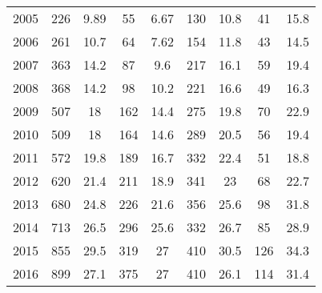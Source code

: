 \begin{table}[htbp]
\begin{tabular}{l*{8}{c}}
2005      &      226&     9.89&       55&     6.67&      130&     10.8&       41&     15.8\\
2006      &      261&     10.7&       64&     7.62&      154&     11.8&       43&     14.5\\
2007      &      363&     14.2&       87&      9.6&      217&     16.1&       59&     19.4\\
2008      &      368&     14.2&       98&     10.2&      221&     16.6&       49&     16.3\\
2009      &      507&       18&      162&     14.4&      275&     19.8&       70&     22.9\\
2010      &      509&       18&      164&     14.6&      289&     20.5&       56&     19.4\\
2011      &      572&     19.8&      189&     16.7&      332&     22.4&       51&     18.8\\
2012      &      620&     21.4&      211&     18.9&      341&       23&       68&     22.7\\
2013      &      680&     24.8&      226&     21.6&      356&     25.6&       98&     31.8\\
2014      &      713&     26.5&      296&     25.6&      332&     26.7&       85&     28.9\\
2015      &      855&     29.5&      319&       27&      410&     30.5&      126&     34.3\\
2016      &      899&     27.1&      375&       27&      410&     26.1&      114&     31.4\\
\hline\hline
\end{tabular}
\end{table}
